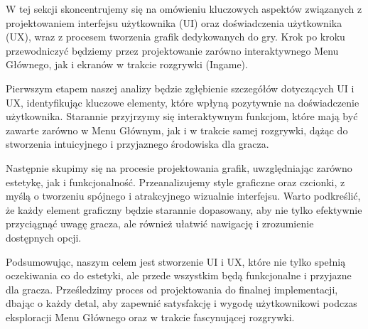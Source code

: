 W tej sekcji skoncentrujemy się na omówieniu kluczowych aspektów związanych z projektowaniem interfejsu użytkownika (UI) oraz doświadczenia użytkownika (UX), wraz z procesem tworzenia grafik dedykowanych do gry. Krok po kroku przewodniczyć będziemy przez projektowanie zarówno interaktywnego Menu Głównego, jak i ekranów w trakcie rozgrywki (Ingame).

Pierwszym etapem naszej analizy będzie zgłębienie szczegółów dotyczących UI i UX, identyfikując kluczowe elementy, które wpłyną pozytywnie na doświadczenie użytkownika. Starannie przyjrzymy się interaktywnym funkcjom, które mają być zawarte zarówno w Menu Głównym, jak i w trakcie samej rozgrywki, dążąc do stworzenia intuicyjnego i przyjaznego środowiska dla gracza.

Następnie skupimy się na procesie projektowania grafik, uwzględniając zarówno estetykę, jak i funkcjonalność. Przeanalizujemy style graficzne oraz czcionki, z myślą o tworzeniu spójnego i atrakcyjnego wizualnie interfejsu. Warto podkreślić, że każdy element graficzny będzie starannie dopasowany, aby nie tylko efektywnie przyciągnąć uwagę gracza, ale również ułatwić nawigację i zrozumienie dostępnych opcji.

Podsumowując, naszym celem jest stworzenie UI i UX, które nie tylko spełnią oczekiwania co do estetyki, ale przede wszystkim będą funkcjonalne i przyjazne dla gracza. Prześledzimy proces od projektowania do finalnej implementacji, dbając o każdy detal, aby zapewnić satysfakcję i wygodę użytkownikowi podczas eksploracji Menu Głównego oraz w trakcie fascynującej rozgrywki.